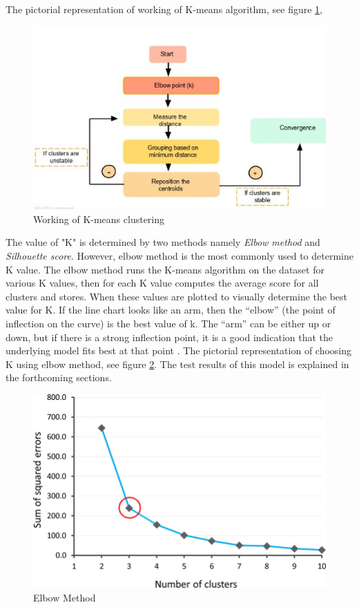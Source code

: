 \documentclass[format=sigconf]{acmart}
\begin{document}
The pictorial representation of working of K-means algorithm, see figure \ref{fig:kmeansworking},
\begin{figure}[H]
    \centering
    \includegraphics[scale=0.55]{images/kmeans_1.jpeg}
    \caption{Working of K-means clustering}
    \label{fig:kmeansworking}
\end{figure}

The value of "K" is determined by two methods namely \textit{Elbow method} and \textit{Silhouette score}. However, elbow method is 
the most commonly used to determine K value. The elbow method runs the K-means algorithm on the dataset for various K values, then
for each K value computes the average score for all clusters and stores. When these values are plotted to visually determine the best 
value for K. If the line chart looks like an arm, then the “elbow” (the point of inflection on the curve) is the best value of k. 
The “arm” can be either up or down, but if there is a strong inflection point, it is a good indication that the underlying model 
fits best at that point \cite{elbow}. The pictorial representation of choosing K using elbow method, see figure \ref{fig:elbowmethod}.
The test results of this model is explained in the forthcoming sections.
\begin{figure}[H]
    \centering
    \includegraphics[scale=0.25]{images/elbow_method.png}
    \caption{Elbow Method}
    \label{fig:elbowmethod}
\end{figure}
\end{document}
